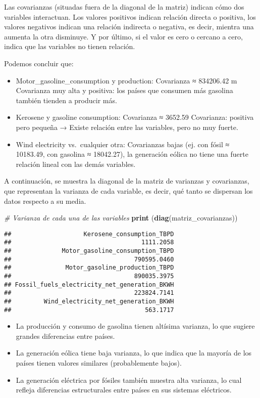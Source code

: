 \documentclass[
]{article}
\newenvironment{Shaded}{\begin{snugshade}}{\end{snugshade}}
\newcommand{\CommentTok}[1]{\textcolor[rgb]{0.56,0.35,0.01}{\textit{#1}}}
\newcommand{\FunctionTok}[1]{\textcolor[rgb]{0.13,0.29,0.53}{\textbf{#1}}}
\newcommand{\NormalTok}[1]{#1}
\begin{document}
Las covarianzas (situadas fuera de la diagonal de la matriz) indican
cómo dos variables interactuan. Los valores positivos indican relación
directa o positiva, los valores negativos indican una relación indirecta
o negativa, es decir, mientra una aumenta la otra disminuye. Y por
último, si el valor es cero o cercano a cero, indica que las variables
no tienen relación.

Podemos concluir que:

\begin{itemize}
\item
  Motor\_gasoline\_consumption y production: Covarianza ≈ 834206.42 m
  Covarianza muy alta y positiva: los países que consumen más gasolina
  también tienden a producir más.
\item
  Kerosene y gasoline consumption: Covarianza ≈ 3652.59 Covarianza:
  positiva pero pequeña → Existe relación entre las variables, pero no
  muy fuerte.
\item
  Wind electricity vs.~cualquier otra: Covarianzas bajas (ej. con fósil
  ≈ 10183.49, con gasolina ≈ 18042.27), la generación eólica no tiene
  una fuerte relación lineal con las demás variables.
\end{itemize}

A continuación, se muestra la diagonal de la matriz de varianzas y
covarianzas, que representan la varianza de cada variable, es decir, qué
tanto se dispersan los datos respecto a su media.

\begin{Shaded}
\begin{Highlighting}[]
\CommentTok{\# Varianza de cada una de las variables}
\FunctionTok{print}\NormalTok{ (}\FunctionTok{diag}\NormalTok{(matriz\_covarianzas))}
\end{Highlighting}
\end{Shaded}

\begin{verbatim}
##                    Kerosene_consumption_TBPD 
##                                    1111.2058 
##              Motor_gasoline_consumption_TBPD 
##                                  790595.0460 
##               Motor_gasoline_production_TBPD 
##                                  890035.3975 
## Fossil_fuels_electricity_net_generation_BKWH 
##                                  223824.7141 
##         Wind_electricity_net_generation_BKWH 
##                                     563.1717
\end{verbatim}

\begin{itemize}
\item
  La producción y consumo de gasolina tienen altísima varianza, lo que
  sugiere grandes diferencias entre países.
\item
  La generación eólica tiene baja varianza, lo que indica que la mayoría
  de los países tienen valores similares (probablemente bajos).
\item
  La generación eléctrica por fósiles también muestra alta varianza, lo
  cual refleja diferencias estructurales entre países en sus sistemas
  eléctricos.
\end{itemize}
\end{document}

